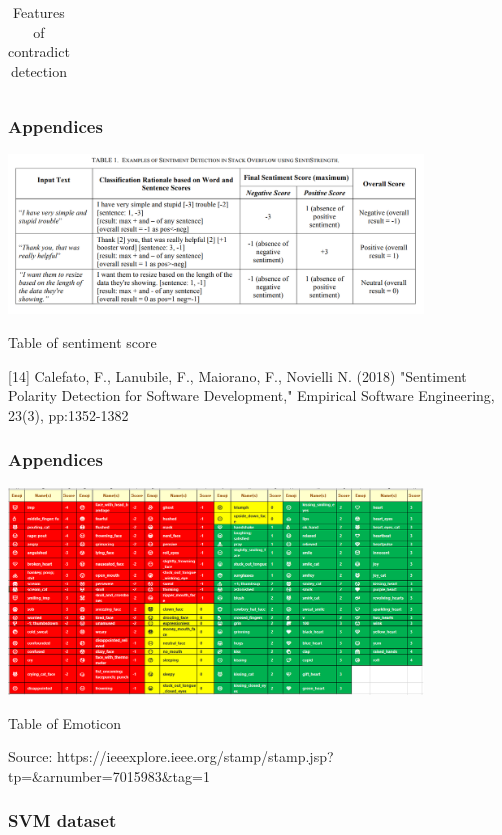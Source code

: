 \documentclass{beamer}
\begin{document}
\begin{frame}
{\begin{table}[]
\begin{tabular}{|l|l|lll}
		
		\end{tabular}
		\caption{Features of contradict detection}
		\label{tab:3}
\end{table}}

\end{frame}
\begin{frame}
\frametitle{Appendices}
\includegraphics[width=110mm]{sent23.png}	\\
\begin{center}
	Table of sentiment score
\end{center}
 \begin{thebibliography}{01}
	{\tiny {} [14] Calefato, F., Lanubile, F., Maiorano, F., Novielli N. (2018) "Sentiment Polarity Detection for Software Development," Empirical Software Engineering, 23(3), pp:1352-1382}
\end{thebibliography}
\end{frame}


\begin{frame}
\frametitle{Appendices}
\includegraphics[width=110mm]{emo.png}	\\
\begin{center}
	Table of Emoticon
\end{center}
{\tiny Source: https://ieeexplore.ieee.org/stamp/stamp.jsp?tp=\&arnumber=7015983\&tag=1}
\end{frame}
\frametitle{SVM dataset}
\end{document}
